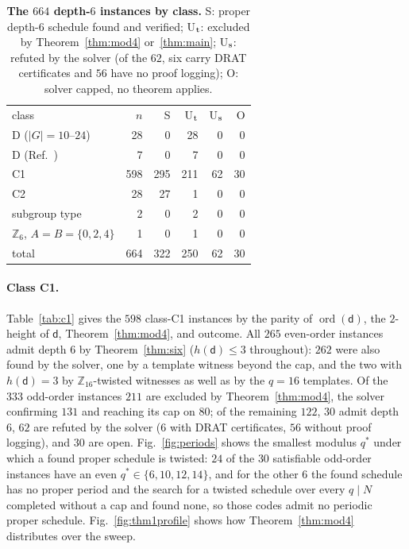 \documentclass[reprint,twocolumn,superscriptaddress,nofootinbib]{revtex4-2}
\theoremstyle{plain}
\newcommand{\col}{\mathsf{d}}          %
\begin{document}
\begin{table}[!htbp]
\caption{\textbf{The $664$ depth-$6$ instances by class.} S: proper
depth-$6$ schedule found and verified; U$_{\rm t}$: excluded by
Theorem~\ref{thm:mod4} or~\ref{thm:main}; U$_{\rm s}$: refuted by the
solver (of the $62$, six carry DRAT certificates and $56$ have no proof
logging); O: solver capped, no theorem applies.}
\label{tab:h2}
\begin{ruledtabular}
\begin{tabular}{lrrrrr}
class & $n$ & S & U$_{\rm t}$ & U$_{\rm s}$ & O \\
\colrule
D ($|G|=10$--$24$)  & 28  & 0   & 28  & 0  & 0  \\
D (Ref.~\cite{Bravyi2024}) & 7 & 0 & 7  & 0  & 0  \\
C1                  & 598 & 295 & 211 & 62 & 30 \\
C2                  & 28  & 27  & 1   & 0  & 0  \\
subgroup type       & 2   & 0   & 2   & 0  & 0  \\
$\mathbb{Z}_6$, $A=B=\{0,2,4\}$ & 1 & 0 & 1 & 0 & 0 \\
\colrule
total               & 664 & 322 & 250 & 62 & 30 \\
\end{tabular}
\end{ruledtabular}
\end{table}

\paragraph*{Class C1.}
Table~\ref{tab:c1} gives the $598$ class-C1 instances by the parity of
$\operatorname{ord}(\col)$, the $2$-height of $\col$,
Theorem~\ref{thm:mod4}, and outcome. All $265$ even-order instances admit
depth $6$ by Theorem~\ref{thm:six} ($h(\col)\le3$ throughout): $262$ were
also found by the solver, one by a template witness beyond the cap, and
the two with $h(\col)=3$ by $\mathbb{Z}_{16}$-twisted witnesses as well as
by the $q=16$ templates. Of the $333$ odd-order instances $211$ are
excluded by Theorem~\ref{thm:mod4}, the solver confirming $131$ and
reaching its cap on $80$; of the remaining $122$, $30$ admit depth $6$,
$62$ are refuted by the solver ($6$ with DRAT certificates, $56$ without
proof logging), and $30$ are open. Fig.~\ref{fig:periods} shows the
smallest modulus $q^\ast$ under which a found proper schedule is twisted:
$24$ of the $30$ satisfiable odd-order instances have an even
$q^\ast\in\{6,10,12,14\}$, and for the other $6$ the found schedule has no
proper period and the search for a twisted schedule over every $q\mid N$
completed without a cap and found none, so those codes admit no periodic
proper schedule. Fig.~\ref{fig:thm1profile} shows how
Theorem~\ref{thm:mod4} distributes over the sweep.
\end{document}
